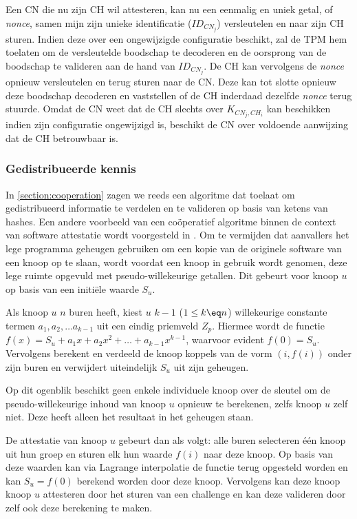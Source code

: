 Een CN die nu zijn CH wil attesteren, kan nu een eenmalig en uniek getal, of
\emph{nonce}, samen mijn zijn unieke identificatie ($ID_{CN_j}$) versleutelen
en naar zijn CH sturen. Indien deze over een ongewijzigde configuratie
beschikt, zal de TPM hem toelaten om de versleutelde boodschap te decoderen en
de oorsprong van de boodschap te valideren aan de hand van $ID_{CN_j}$. De CH
kan vervolgens de \emph{nonce} opnieuw versleutelen en terug sturen naar de CN.
Deze kan tot slotte opnieuw deze boodschap decoderen en vaststellen of de CH
inderdaad dezelfde \emph{nonce} terug stuurde. Omdat de CN weet dat de CH
slechts over $K_{CN_j,CH_i}$ kan beschikken indien zijn configuratie
ongewijzigd is, beschikt de CN over voldoende aanwijzing dat de CH betrouwbaar
is.

\subsubsection*{Gedistribueerde kennis}

In \ref{section:cooperation} zagen we reeds een algoritme dat toelaat om
gedistribueerd informatie te verdelen en te valideren op basis van ketens van
hashes. Een andere voorbeeld van een co\"operatief algoritme binnen de context
van software attestatie wordt voorgesteld in \cite{yang2007distributed}. Om te
vermijden dat aanvallers het lege programma geheugen gebruiken om een kopie van
de originele software van een knoop op te slaan, wordt voordat een knoop in
gebruik wordt genomen, deze lege ruimte opgevuld met pseudo-willekeurige
getallen. Dit gebeurt voor knoop $u$ op basis van een initi\"ele waarde $S_u$.

Als knoop $u$ $n$ buren heeft, kiest $u$ $k - 1$ ($1 \leq k \eq n$)
willekeurige constante termen $a_1, a_2, \dots a_{k-1}$ uit een eindig
priemveld $Z_p$. Hiermee wordt de functie $f(x) = S_u + a_1 x+a_2 x^2 + \dots +
a_{k-1} x^{k-1}$, waarvoor evident $f(0) = S_u$. Vervolgens berekent en
verdeeld de knoop koppels van de vorm $(i,f(i))$ onder zijn buren en verwijdert
uiteindelijk $S_u$ uit zijn geheugen.

Op dit ogenblik beschikt geen enkele individuele knoop over de sleutel om de
pseudo-willekeurige inhoud van knoop $u$ opnieuw te berekenen, zelfs knoop $u$
zelf niet. Deze heeft alleen het resultaat in het geheugen staan.

De attestatie van knoop $u$ gebeurt dan als volgt: alle buren selecteren
\'e\'en knoop uit hun groep en sturen elk hun waarde $f(i)$ naar deze knoop. Op
basis van deze waarden kan via Lagrange interpolatie de functie terug opgesteld
worden en kan $S_u = f(0)$ berekend worden door deze knoop. Vervolgens kan deze
knoop knoop $u$ attesteren door het sturen van een challenge en kan deze
valideren door zelf ook deze berekening te maken.

